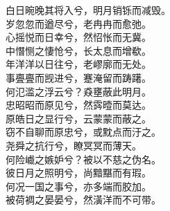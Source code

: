 \documentclass[]{article}
\begin{document}
白日晼晚其将入兮，明月销铄而减毁。\\
岁忽忽而遒尽兮，老冉冉而愈弛。\\
心摇悦而日幸兮，然怊怅而无冀。\\
中憯恻之悽怆兮，长太息而增欷。\\
年洋洋以日往兮，老嵺廓而无处。\\
事亹亹而觊进兮，蹇淹留而踌躇。\\
何氾滥之浮云兮？猋壅蔽此明月。\\
忠昭昭而原见兮，然霠曀而莫达。\\
原皓日之显行兮，云蒙蒙而蔽之。\\
窃不自聊而原忠兮，或黕点而汙之。\\
尧舜之抗行兮，瞭冥冥而薄天。\\
何险巇之嫉妒兮？被以不慈之伪名。\\
彼日月之照明兮，尚黯黮而有瑕。\\
何况一国之事兮，亦多端而胶加。\\
被荷裯之晏晏兮，然潢洋而不可带。
\end{document}
